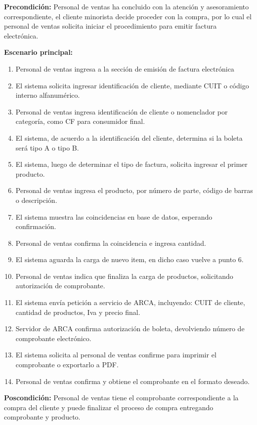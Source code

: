 \textbf{Precondición:} 
Personal de ventas ha concluido con la atención y asesoramiento correspondiente,
el cliente minorista decide proceder con la compra,
por lo cual el personal de ventas solicita iniciar el procedimiento para emitir factura electrónica.

\textbf{Escenario principal:}
\begin{enumerate}
	\item Personal de ventas ingresa a la sección de emisión de factura electrónica
	\item El sistema solicita ingresar identificación de cliente, mediante CUIT o código interno alfanumérico.
	\item Personal de ventas ingresa identificación de cliente o nomenclador por categoría, como CF para consumidor final.
	\item El sistema, de acuerdo a la identificación del cliente, determina si la boleta será tipo A o tipo B.
	\item El sistema, luego de determinar el tipo de factura, solicita ingresar el primer producto.
	\item Personal de ventas ingresa el producto, por número de parte, código de barras o descripción.
	\item El sistema muestra las coincidencias en base de datos, esperando confirmación.
	\item Personal de ventas confirma la coincidencia e ingresa cantidad.
	\item El sistema aguarda la carga de nuevo item, en dicho caso vuelve a punto 6.
	\item Personal de ventas indica que finaliza la carga de productos, solicitando autorización de comprobante.
	\item El sistema envía petición a servicio de ARCA, incluyendo: CUIT de cliente, cantidad de productos, Iva y precio final.
	\item Servidor de ARCA confirma autorización de boleta, devolviendo número de comprobante electrónico.
	\item El sistema solicita al personal de ventas confirme para imprimir el comprobante o exportarlo a PDF.
	\item Personal de ventas confirma y obtiene el comprobante en el formato deseado.
\end{enumerate}

\textbf{Poscondición:}
Personal de ventas tiene el comprobante correspondiente a la compra del cliente y puede finalizar el proceso de compra entregando comprobante y producto.

